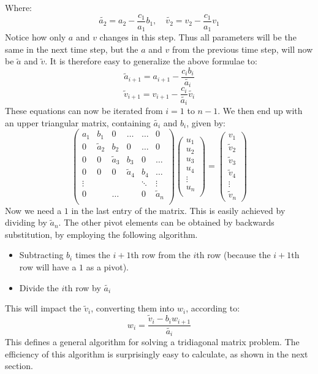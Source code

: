 \documentclass[a4paper, 10pt]{article}
\begin{document}
Where:
$$\tilde{a_2}=a_2-\frac{c_1}{a_1}b_1, \quad \tilde{v_2}=v_2-\frac{c_1}{a_1}v_1$$
Notice how only $a$ and $v$ changes in this step. Thus all parameters will be the same in the next time step, but the $a$ and $v$ from the previous time step, will now be $\tilde{a}$ and $\tilde{v}$. It is therefore easy to generalize the above formulae to:
\begin{equation}\label{eq:forward_substitution_1}
\tilde{a}_{i+1}=a_{i+1}-\frac{c_ib_i}{\tilde{a_i}}
\end{equation}
\begin{equation}\label{eq:forward_substitution_2}
\tilde{v}_{i+1}=v_{i+1}-\frac{c_i}{\tilde{a_i}}\tilde{v_i}
\end{equation}
These equations can now be iterated from $i=1$ to $n-1$. We then end up with an upper triangular matrix, containing $\tilde{a_i}$ and $b_i$, given by:
$$\begin{pmatrix}
a_{1} & b_1 & 0 & \ldots &  \ldots & 0\\
0 & \tilde{a}_2 & b_2  & 0 & \ldots & 0\\
0 & 0 & \tilde{a}_3 &b_3 & 0 & \ldots \\
0 & 0 & 0 & \tilde{a}_4 &b_4 &\ldots\\
\vdots &  & &  &\ddots & \vdots \\
0 && \ldots && 0&  \tilde{a}_n  \\
\end{pmatrix}\begin{pmatrix}
u_1\\
u_2\\
u_3\\
u_4\\
\vdots\\
u_n\\
\end{pmatrix}=\begin{pmatrix}
v_1\\
\tilde{v}_2\\
\tilde{v}_3\\
\tilde{v}_4\\
\vdots\\
\tilde{v}_n
\end{pmatrix}$$
Now we need a $1$ in the last entry of the matrix. This is easily achieved by dividing by $\tilde{a}_n$. The other pivot elements can be obtained by backwards substitution, by employing the following algorithm. 
\begin{itemize}
\item Subtracting $b_i$ times the $i+1$th row from the $i$th row (because the $i+1$th row will have a $1$ as a pivot).
\item Divide the $i$th row by $\tilde{a_i}$
\end{itemize}
This will impact the $\tilde{v}_i$, converting them into $w_i$, according to:
\begin{equation}\label{eq:backwards_substitution}
w_i=\frac{\tilde{v}_i-b_iw_{i+1}}{\tilde{a_i}}
\end{equation}
This defines a general algorithm for solving a tridiagonal matrix problem. The efficiency of this algorithm is surprisingly easy to calculate, as shown in the next section.
\end{document}
